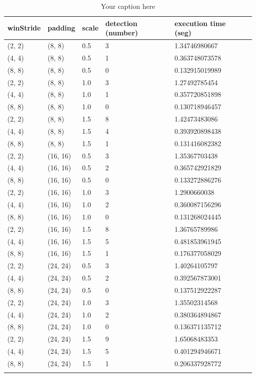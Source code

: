 \begin{longtable}{|l|l|l|l|l|l|} 
	\hline
	\textbf{winStride} & \textbf{padding} & \textbf{scale} & \textbf{detection (number)} & \textbf{execution time (seg)} \\ \hline
(2, 2) & (8, 8) & 0.5 & 3 & 1.34746980667 \\ \hline
(4, 4) & (8, 8) & 0.5 & 1 & 0.363748073578 \\ \hline
(8, 8) & (8, 8) & 0.5 & 0 & 0.132915019989 \\ \hline
(2, 2) & (8, 8) & 1.0 & 3 & 1.27492785454 \\ \hline
(4, 4) & (8, 8) & 1.0 & 1 & 0.357720851898 \\ \hline
(8, 8) & (8, 8) & 1.0 & 0 & 0.130718946457 \\ \hline
(2, 2) & (8, 8) & 1.5 & 8 & 1.42473483086 \\ \hline
(4, 4) & (8, 8) & 1.5 & 4 & 0.393920898438 \\ \hline
(8, 8) & (8, 8) & 1.5 & 1 & 0.131416082382 \\ \hline
(2, 2) & (16, 16) & 0.5 & 3 & 1.35367703438 \\ \hline
(4, 4) & (16, 16) & 0.5 & 2 & 0.365742921829 \\ \hline
(8, 8) & (16, 16) & 0.5 & 0 & 0.133272886276 \\ \hline
(2, 2) & (16, 16) & 1.0 & 3 & 1.2900660038 \\ \hline
(4, 4) & (16, 16) & 1.0 & 2 & 0.360087156296 \\ \hline
(8, 8) & (16, 16) & 1.0 & 0 & 0.131268024445 \\ \hline
(2, 2) & (16, 16) & 1.5 & 8 & 1.36765789986 \\ \hline
(4, 4) & (16, 16) & 1.5 & 5 & 0.481853961945 \\ \hline
(8, 8) & (16, 16) & 1.5 & 1 & 0.176377058029 \\ \hline
(2, 2) & (24, 24) & 0.5 & 3 & 1.40264105797 \\ \hline
(4, 4) & (24, 24) & 0.5 & 2 & 0.392567873001 \\ \hline
(8, 8) & (24, 24) & 0.5 & 0 & 0.137512922287 \\ \hline
(2, 2) & (24, 24) & 1.0 & 3 & 1.35502314568 \\ \hline
(4, 4) & (24, 24) & 1.0 & 2 & 0.380364894867 \\ \hline
(8, 8) & (24, 24) & 1.0 & 0 & 0.136371135712 \\ \hline
(2, 2) & (24, 24) & 1.5 & 9 & 1.65068483353 \\ \hline
(4, 4) & (24, 24) & 1.5 & 5 & 0.401294946671 \\ \hline
(8, 8) & (24, 24) & 1.5 & 1 & 0.206337928772 \\ \hline

	
	\caption{Your caption here} %
	\label{tab:myfirstlongtable}
\end{longtable}











